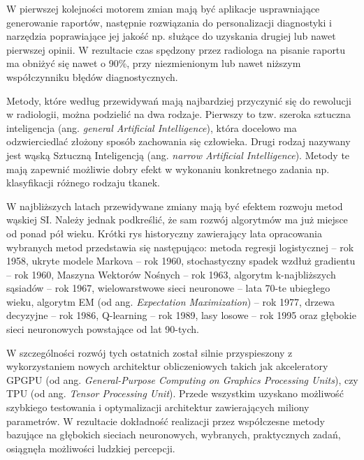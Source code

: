 W pierwszej kolejności motorem zmian mają być aplikacje usprawniające generowanie raportów, następnie rozwiązania do personalizacji diagnostyki i narzędzia poprawiające jej jakość np. służące do uzyskania drugiej lub nawet pierwszej opinii. W rezultacie czas spędzony przez radiologa na pisanie raportu ma obniżyć się nawet o 90\%, przy niezmienionym lub nawet niższym współczynniku błędów diagnostycznych.

Metody, które według przewidywań mają najbardziej przyczynić się do rewolucji w radiologii, można podzielić na dwa rodzaje. Pierwszy to tzw. szeroka sztuczna inteligencja (ang. \textit{general Artificial Intelligence}), która docelowo ma odzwierciedlać złożony sposób zachowania się człowieka. Drugi rodzaj nazywany jest wąską Sztuczną Inteligencją (ang. \textit{narrow Artificial Intelligence}). Metody te mają zapewnić możliwie dobry efekt w wykonaniu konkretnego zadania np. klasyfikacji różnego rodzaju tkanek. 

W najbliższych latach przewidywane zmiany mają być efektem rozwoju metod wąskiej SI. Należy jednak podkreślić, że sam rozwój algorytmów ma już miejsce od ponad pół wieku. Krótki rys historyczny zawierający lata opracowania wybranych metod przedstawia się następująco: metoda regresji logistycznej -- rok 1958, ukryte modele Markova -- rok 1960, stochastyczny spadek wzdłuż gradientu -- rok 1960, Maszyna Wektorów Nośnych -- rok 1963, algorytm k-najbliższych sąsiadów -- rok 1967, wielowarstwowe sieci neuronowe -- lata 70-te ubiegłego wieku, algorytm EM (od ang. \textit{Expectation Maximization}) -- rok 1977, drzewa decyzyjne -- rok 1986, Q-learning -- rok 1989, lasy losowe -- rok 1995 oraz głębokie sieci neuronowych powstające \linebreak od lat 90-tych. 

W szczególności rozwój tych ostatnich został silnie przyspieszony z wykorzystaniem nowych architektur obliczeniowych takich jak akceleratory GPGPU (od ang. \textit{General-Purpose Computing on Graphics Processing Units}), czy TPU (od ang. \textit{Tensor Processing Unit}). Przede wszystkim uzyskano możliwość szybkiego testowania \linebreak i optymalizacji architektur zawierających miliony parametrów. W rezultacie dokładność realizacji przez współczesne metody bazujące na głębokich sieciach neuronowych, wybranych, praktycznych zadań, osiągnęła możliwości ludzkiej percepcji. 

